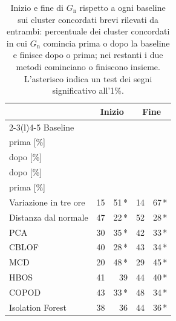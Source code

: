 \begin{table}[htbp]
    \centering
    \footnotesize
    \caption{Inizio e fine di $G_{\mathrm{n}}$ rispetto a ogni baseline sui cluster concordati brevi rilevati da entrambi: percentuale dei cluster concordati in cui $G_{\mathrm{n}}$ comincia prima o dopo la baseline e finisce dopo o prima; nei restanti i due metodi cominciano o finiscono insieme. L'asterisco indica un test dei segni significativo all'1\%.}
    \label{tab:ris-concordate-inizio}
    \vspace{0.6em}
    \begin{tabular}{@{}lrrrr@{}}
        \toprule
         & \multicolumn{2}{c}{Inizio} & \multicolumn{2}{c}{Fine} \\
        \cmidrule(lr){2-3}\cmidrule(l){4-5}
        Baseline & \shortstack[r]{$G_{\mathrm{n}}$\\prima [\%]} & \shortstack[r]{$G_{\mathrm{n}}$\\dopo [\%]} & \shortstack[r]{$G_{\mathrm{n}}$\\dopo [\%]} & \shortstack[r]{$G_{\mathrm{n}}$\\prima [\%]} \\
        \midrule
        Variazione in tre ore & 15 & 51\,* & 14 & 67\,* \\
        Distanza dal normale & 47 & 22\,* & 52 & 28\,* \\
        PCA & 30 & 35\,* & 42 & 33\,* \\
        CBLOF & 40 & 28\,* & 43 & 34\,* \\
        MCD & 20 & 48\,* & 29 & 45\,* \\
        HBOS & 41 & 39 & 44 & 40\,* \\
        COPOD & 43 & 33\,* & 48 & 34\,* \\
        Isolation Forest & 38 & 36 & 44 & 36\,* \\
        \bottomrule
    \end{tabular}
\end{table}

